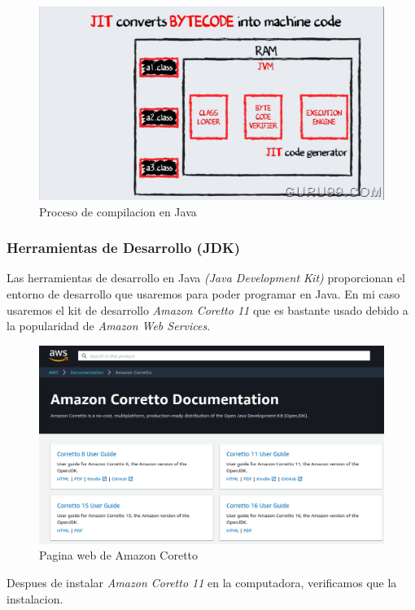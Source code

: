\documentclass{article}
\begin{document}
		\begin{figure}[H]
			\centering
			\includegraphics[scale = 0.2]{images/javacomp2}
			\caption{Proceso de compilacion en Java}
		\end{figure}
		\newpage
	
		\subsubsection{Herramientas de Desarrollo (JDK)}
		
		Las herramientas de desarrollo en Java \emph{(Java Development Kit)} proporcionan el entorno de desarrollo que usaremos para poder programar en Java. En mi caso usaremos el kit de desarrollo \emph{Amazon Coretto 11} que es bastante usado debido a la popularidad de \emph{Amazon Web Services}. 
		
		\begin{figure}[H]
			\centering
			\includegraphics[scale = 0.35]{images/corettodoc}
			\caption{Pagina web de Amazon Coretto}
		\end{figure}
	
		Despues de instalar \emph{Amazon Coretto 11} en la computadora, verificamos que la instalacion.
		
\end{document}
